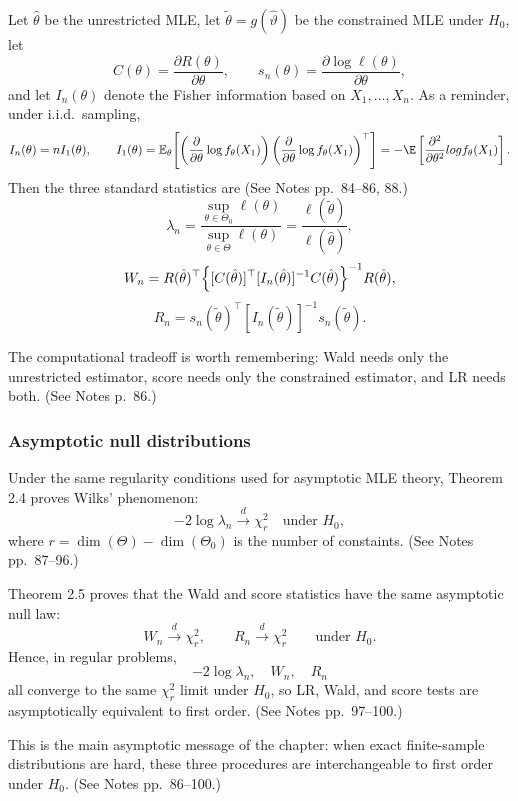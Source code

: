
Let $\hat\theta$ be the unrestricted MLE, let $\tilde\theta = g(\hat\vartheta)$ be the constrained MLE under $H_0$, let
\[
C(\theta)=\frac{\partial R(\theta)}{\partial \theta},
\qquad
s_n(\theta)=\frac{\partial \log \ell(\theta)}{\partial \theta},
\]
and let $I_n(\theta)$ denote the Fisher information based on $X_1,\dots,X_n$. As a reminder, under i.i.d.\ sampling,
\[
I_n(\theta)=n I_1(\theta),
\qquad
I_1(\theta)=\mathbb E_\theta\!\left[
\left(
\frac{\partial}{\partial \theta}\log f_\theta(X_1)
\right)
\left(
\frac{\partial}{\partial \theta}\log f_\theta(X_1)
\right)^\top
\right]
= -\E\left[
    \frac{\partial^2}{\partial\theta^2} log f_\theta(X_1)
\right].
\]
Then the three standard statistics are (See Notes pp.~84--86, 88.)
\[
\lambda_n
=
\frac{\sup_{\theta\in\Theta_0}\ell(\theta)}{\sup_{\theta\in\Theta}\ell(\theta)}
=
\frac{\ell(\tilde\theta)}{\ell(\hat\theta)},
\]
\[
W_n
=
R(\hat\theta)^\top
\Bigl\{
[C(\hat\theta)]^\top [I_n(\hat\theta)]^{-1} C(\hat\theta)
\Bigr\}^{-1}
R(\hat\theta),
\]
\[
R_n
=
s_n(\tilde\theta)^\top [I_n(\tilde\theta)]^{-1} s_n(\tilde\theta).
\]

The computational tradeoff is worth remembering: Wald needs only the unrestricted estimator, score needs only the constrained estimator, and LR needs both. (See Notes p.~86.)

\subsubsection{Asymptotic null distributions}
Under the same regularity conditions used for asymptotic MLE theory, Theorem 2.4 proves Wilks' phenomenon:
\[
-2 \log \lambda_n \overset{d}{\to} \chi_r^2
\quad \text{under } H_0,
\]
where $r = \dim(\Theta)-\dim(\Theta_0)$ is the number of constaints. (See Notes pp.~87--96.)

Theorem 2.5 proves that the Wald and score statistics have the same asymptotic null law:
\[
W_n \overset{d}{\to} \chi_r^2,
\qquad
R_n \overset{d}{\to} \chi_r^2
\qquad \text{under } H_0.
\]
Hence, in regular problems,
\[
-2 \log \lambda_n,\quad W_n,\quad R_n
\]
all converge to the same $\chi_r^2$ limit under $H_0$, so LR, Wald, and score tests are asymptotically equivalent to first order. (See Notes pp.~97--100.)


This is the main asymptotic message of the chapter: when exact finite-sample distributions are hard, these three procedures are interchangeable to first order under $H_0$. (See Notes pp.~86--100.)

